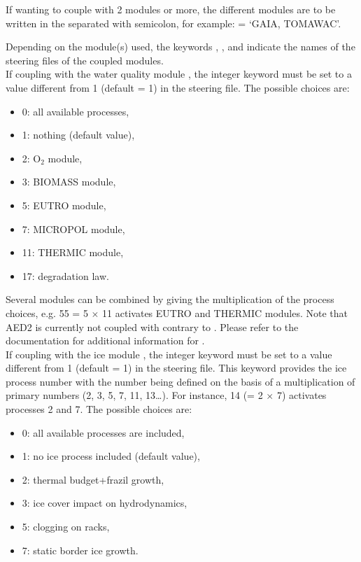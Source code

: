 If wanting to couple with 2 modules or more, the different modules are to
be written in the  separated with semicolon, for example:
 = `GAIA, TOMAWAC'.

Depending on the module(s) used, the keywords ,
,  and
 indicate the names of the steering files of the
coupled modules.\\

If coupling with the water quality module \waqtel, the integer keyword
 must be set to a value different from 1
(default = 1) in the  steering file.
The possible choices are:
\begin{itemize}
\item 0: all available processes,
\item 1: nothing (default value),
\item 2: O$_2$ module,
\item 3: BIOMASS module,
\item 5: EUTRO module,
\item 7: MICROPOL module,
\item 11: THERMIC module,
\item 17: degradation law.
\end{itemize}

Several modules can be combined by giving the multiplication of the process
choices, e.g. 55 = 5 $\times$ 11 activates EUTRO and THERMIC modules.
Note that AED2 is currently not coupled with  contrary to
.
Please refer to the \waqtel documentation for additional information for
\waqtel.\\

If coupling with the ice module \khione, the integer keyword
 must be set to a value different from 1
(default = 1) in the  steering file.
This keyword provides the ice process number with the number being defined on
the basis of a multiplication of primary numbers (2, 3, 5, 7, 11, 13\ldots).
For instance, 14 (= 2 $\times$ 7) activates processes 2 and 7.
The possible choices are:
\begin{itemize}
\item 0: all available processes are included,
\item 1: no ice process included (default value),
\item 2: thermal budget+frazil growth,
\item 3: ice cover impact on hydrodynamics,
\item 5: clogging on racks,
\item 7: static border ice growth.
\end{itemize}

